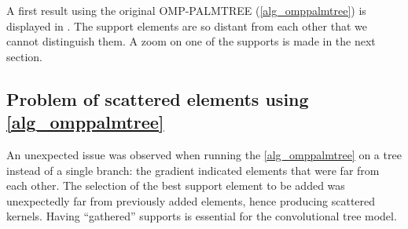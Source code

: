 \noindent
A first result using the original OMP-PALMTREE (\cref{alg_omppalmtree}) is displayed in . The support elements are so distant from each other that we cannot distinguish them. A zoom on one of the supports is made in the next section.


\subsection{Problem of scattered elements using \cref{alg_omppalmtree}}
 
An unexpected issue was observed when running the \cref{alg_omppalmtree} on a tree instead of a single branch: the gradient indicated elements that were far from each other. The selection of the best support element to be added was unexpectedly far from previously added elements, hence producing scattered kernels. Having “gathered” supports is essential for the convolutional tree model.  

